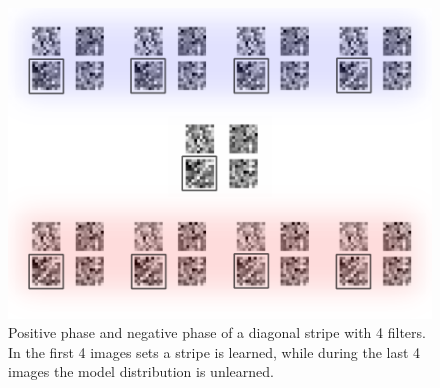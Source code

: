 \begin{figure}[h!]
	\centering
%	
%	
	\includegraphics[width=.9\linewidth]{imgs/inspect/compl.png}
	\caption[Positive phase and negative phase of a diagonal stripe with 4 filters.]{Positive phase and negative phase of a diagonal stripe with 4 filters. In the first 4 images sets a stripe is learned, while during the last 4 images the model distribution is unlearned.}
	\label{fig:ecdstrlearn}
\end{figure}

